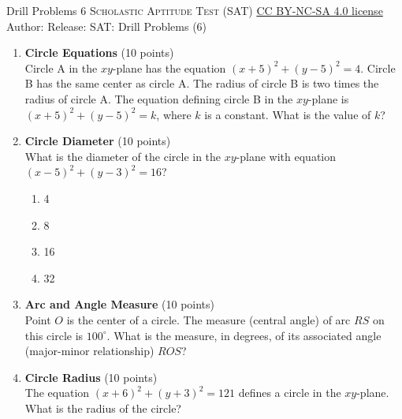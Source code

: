 \newpage\handout
{Drill Problems 6}
{\textsc{Scholastic Aptitude Test (SAT)}}
{\href{https://creativecommons.org/licenses/by-nc-sa/4.0/}{CC BY-NC-SA 4.0 license}}
{Author: \BookAuthor}{Release: \generatedOn}
{SAT: Drill Problems (6)}



\begin{enumerate}
  \item \textbf{Circle Equations} (10 points)\\
  Circle A in the $xy$-plane has the equation $(x+5)^2+(y-5)^2=4$. Circle B has the same center as circle A. The radius of circle B is two times the radius of circle A. The equation defining circle B in the $xy$-plane is $(x+5)^2+(y-5)^2=k$, where $k$ is a constant. What is the value of $k$?
  \begin{subanswer}
  \end{subanswer}

  \item \textbf{Circle Diameter} (10 points)\\
  What is the diameter of the circle in the $xy$-plane with equation $(x-5)^2+(y-3)^2=16$?\\
  \begin{enumerate}[label=(\Alph*)]
    \item 4
    \item 8
    \item 16
    \item 32
  \end{enumerate}
  \begin{subanswer}
  \end{subanswer}

  \item \textbf{Arc and Angle Measure} (10 points)\\
  Point $O$ is the center of a circle. The measure (central angle) of arc $RS$ on this 
  circle is $100^{\circ}$. What is the measure, in degrees, of its associated angle (major-minor relationship) $ROS$?
  \begin{subanswer}
  \end{subanswer}

  \item \textbf{Circle Radius} (10 points)\\
  The equation $(x+6)^2+(y+3)^2=121$ defines a circle in the $xy$-plane. What is the radius of the circle?
  \begin{subanswer}
  \end{subanswer}


\end{enumerate}
